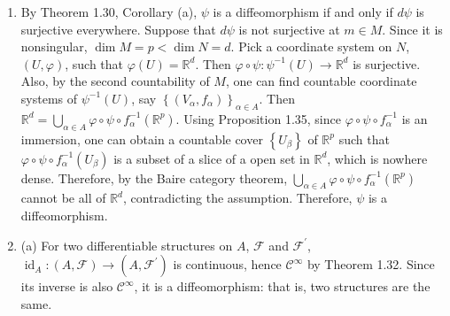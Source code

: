 \begin{enumerate}
(c) By (a) and (b), it directly follows.
\item By Theorem 1.30, Corollary (a), $\psi$ is a diffeomorphism if and only if $d \psi$ is surjective everywhere. 
Suppose that $d \psi$ is not surjective at $m \in M$. 
Since it is nonsingular, $\dim M=p<\dim N=d$. 
Pick a coordinate system on $N$, $(U, \varphi)$, such that $\varphi(U)=\mathbb{R}^{d}$. 
Then $\varphi \circ \psi\colon \psi^{-1}(U) \rightarrow \mathbb{R}^{d}$ is surjective. 
Also, by the second countability of $M$, one can find countable coordinate systems of $\psi^{-1}(U)$, 
say $\left\{\left(V_{\alpha}, f_{\alpha}\right)\right\}_{\alpha \in A}$. 
Then $\mathbb{R}^{d}=\bigcup_{\alpha \in A} \varphi \circ \psi \circ f_{\alpha}^{-1}(\mathbb{R}^{p})$. 
Using Proposition 1.35, since $\varphi \circ \psi \circ f_{\alpha}^{-1}$ is an immersion, 
one can obtain a countable cover $\left\{U_{\beta}\right\}$ of $\mathbb{R}^{p}$ such that $\varphi \circ \psi \circ f_{\alpha}^{-1}(U_{\beta})$ is a subset of a slice of a open set in $\mathbb{R}^{d}$, which is nowhere dense. 
Therefore, by the Baire category theorem, $\bigcup_{\alpha \in A} \varphi \circ \psi \circ f_{\alpha}^{-1}(\mathbb{R}^{p})$ cannot be all of $\mathbb{R}^{d}$, 
contradicting the assumption. Therefore, $\psi$ is a diffeomorphism.
\item (a) For two differentiable structures on $A$, $\mathscr{F}$ and $\mathscr{F}^{\prime}$, 
$\operatorname{id}_{A}\colon(A, \mathscr{F}) \rightarrow\left(A, \mathscr{F}^{\prime}\right)$ is continuous, hence $\mathcal{C}^{\infty}$ by Theorem 1.32. 
Since its inverse is also $\mathcal{C}^{\infty}$, it is a diffeomorphism: that is, two structures are the same.


\end{enumerate}
